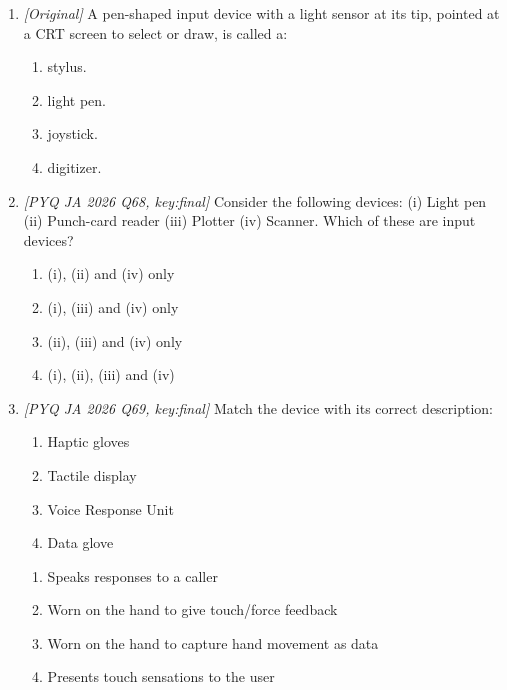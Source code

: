\begin{enumerate}[label=\textbf{Q\arabic*.}, leftmargin=*]
\begin{enumerate}[label=\Alph*.]
      device.
    \item A touchscreen is used only in laptops, whereas a touchpad is used
      only in ATMs.
    \item A touchscreen and a touchpad are the same device under different
      names.
  \end{enumerate}
\item \textit{[Original]} A pen-shaped input device with a light sensor at its
  tip, pointed at a CRT screen to select or draw, is called a:
  \begin{enumerate}[label=\Alph*.]
    \item stylus.
    \item light pen.
    \item joystick.
    \item digitizer.
  \end{enumerate}
\item \textit{[PYQ JA 2026 Q68, key:final]} Consider the following devices:
  (i) Light pen (ii) Punch-card reader (iii) Plotter (iv) Scanner. Which of
  these are input devices?
  \begin{enumerate}[label=\Alph*.]
    \item (i), (ii) and (iv) only
    \item (i), (iii) and (iv) only
    \item (ii), (iii) and (iv) only
    \item (i), (ii), (iii) and (iv)
  \end{enumerate}
\item \textit{[PYQ JA 2026 Q69, key:final]} Match the device with its correct
  description:
  \begin{enumerate}[label=\Roman*.]
    \item Haptic gloves
    \item Tactile display
    \item Voice Response Unit
    \item Data glove
  \end{enumerate}
  \begin{enumerate}[label=\arabic*.]
    \item Speaks responses to a caller
    \item Worn on the hand to give touch/force feedback
    \item Worn on the hand to capture hand movement as data
    \item Presents touch sensations to the user
  \end{enumerate}
  \begin{enumerate}[label=\Alph*.]

\end{enumerate}
\end{enumerate}
